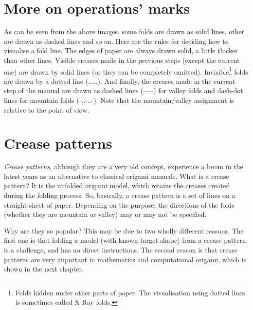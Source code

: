 \section{More on operations' marks}
\label{sec:operationMarks}
As can be seen from the above images, some folds are drawn as solid lines, other are drawn as dashed lines and so on. Here are the rules for deciding how to visualise a fold line. The edges of paper are always drawn solid, a little thicker than other lines. Visible creases made in the previous steps (except the current one) are drawn by solid lines (or they can be completely omitted). Invisible\footnote{Folds hidden under other parts of paper. The visualisation using dotted lines is sometimes called X-Ray folds.} folds are drawn by a dotted line (.....). And finally, the creases made in the current step of the manual are drawn as dashed lines (-----) for valley folds and dash-dot lines for mountain folds (-..-..-). Note that the mountain/valley assignment is relative to the point of view.

\section{Crease patterns}
\label{sec:creasePatterns}
\emph{Crease patterns}, although they are a very old concept, experience a boom in the latest years as an alternative to classical origami manuals. What is a crease pattern? It is the unfolded origami model, which retains the creases created during the folding process. So, basically, a crease pattern is a set of lines on a straight sheet of paper. Depending on the purpose, the directions of the folds (whether they are mountain or valley) may or may not be specified.

Why are they so popular? This may be due to two wholly different reasons. The first one is that folding a model (with known target shape) from a crease pattern is a challenge, and has no direct instructions. The second reason is that crease patterns are very important in mathematics and computational origami, which is shown in the next chapter.
